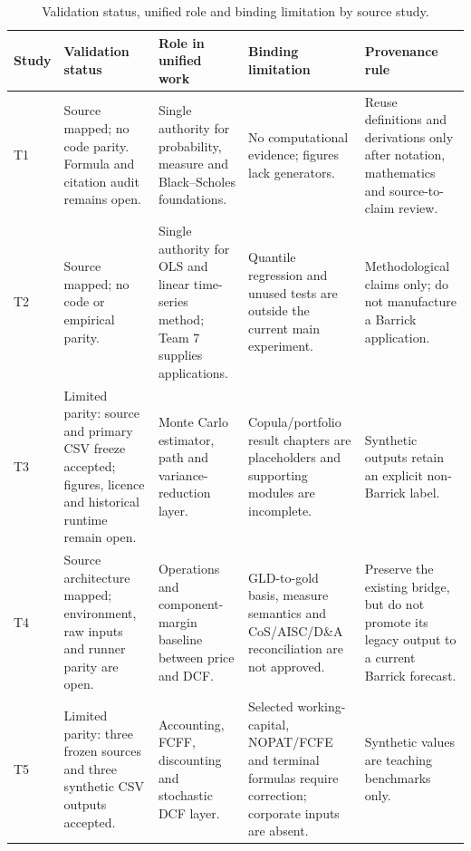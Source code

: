 \begin{table}[H]
\centering
\caption{Validation status, unified role and binding limitation by source study.}
\label{tab:team-validation-role}
\scriptsize
\setlength{\tabcolsep}{3pt}
\renewcommand{\arraystretch}{1.10}
\begin{tabularx}{\textwidth}{@{}p{0.85cm}p{2.97cm}X X X@{}}
\toprule
\textbf{Study} & \textbf{Validation status} & \textbf{Role in unified work} &
\textbf{Binding limitation} & \textbf{Provenance rule} \\
\midrule
T1 & Source mapped; no code parity. Formula and citation audit remains open. &
Single authority for probability, measure and Black--Scholes foundations. &
No computational evidence; figures lack generators. & Reuse definitions and
derivations only after notation, mathematics and source-to-claim review. \\
T2 & Source mapped; no code or empirical parity. & Single authority for OLS and
linear time-series method; Team 7 supplies applications. & Quantile regression
and unused tests are outside the current main experiment. & Methodological
claims only; do not manufacture a Barrick application. \\
T3 & Limited parity: source and primary CSV freeze accepted; figures, licence
and historical runtime remain open. & Monte Carlo estimator, path and
variance-reduction layer. & Copula/portfolio result chapters are placeholders
and supporting modules are incomplete. & Synthetic outputs retain an explicit
non-Barrick label. \\
T4 & Source architecture mapped; environment, raw inputs and runner parity are
open. & Operations and component-margin baseline between price and DCF. &
GLD-to-gold basis, measure semantics and CoS/AISC/D\&A reconciliation are not
approved. & Preserve the existing bridge, but do not promote its legacy output
to a current Barrick forecast. \\
T5 & Limited parity: three frozen sources and three synthetic CSV outputs
accepted. & Accounting, FCFF, discounting and stochastic DCF layer. & Selected
working-capital, NOPAT/FCFE and terminal formulas require correction; corporate
inputs are absent. & Synthetic values are teaching benchmarks only. \\

\end{tabularx}
\end{table}
